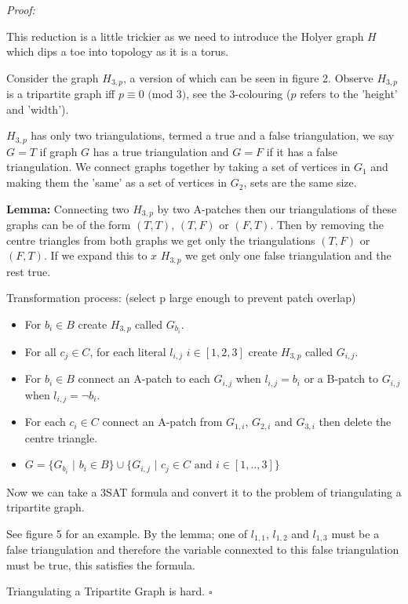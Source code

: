 \documentclass[a4paper,12pt]{article}
\begin{document}
\textit{Proof:}

This reduction is a little trickier as we need to introduce the Holyer graph $H$ which dips a toe into topology as it is a torus.

Consider the graph $H_{3,p}$, a version of which can be seen in figure 2. Observe $H_{3,p}$ is a tripartite graph iff $p\equiv0 \text{ (mod }3)$, see the 3-colouring ($p$ refers to the 'height' and 'width').

$H_{3,p}$ has only two triangulations, termed a true and a false triangulation, we say $G=T$ if graph $G$ has a true triangulation and $G=F$ if it has a false triangulation. We connect graphs together by taking a set of vertices in $G_1$ and making them the 'same' as a set of vertices in $G_2$, sets are the same size.

\textbf{Lemma:} Connecting two $H_{3,p}$ by two A-patches then our triangulations of these graphs can be of the form $(T,T)$, $(T,F)$ or $(F,T)$. Then by removing the centre triangles from both graphs we get only the triangulations $(T,F)$ or $(F,T)$. If we expand this to $x$ $H_{3,p}$ we get only one false triangulation and the rest true.


Transformation process: (select p large enough to prevent patch overlap)
\begin{itemize}
\item For $b_i\in B$ create $H_{3,p}$ called $G_{b_i}$.
\item For all $c_j\in C$, for each literal $l_{i,j}$ $i\in [1,2,3]$ create $H_{3,p}$ called $G_{i,j}$.
\item For $b_i \in B$ connect an A-patch to each $G_{i,j}$ when $l_{i,j}=b_i$ or a B-patch to $G_{i,j}$ when $l_{i,j}=\neg b_i$. 
\item For each $c_i\in C$ connect an A-patch from $G_{1,i}$, $G_{2,i}$ and $G_{3,i}$ then delete the centre triangle. 
\item $G = \{G_{b_i}$ $|$ $b_i \in B\}\cup\{G_{i,j}$ $|$ $ c_j\in C\text{ and }i\in [1,..,3] \}$
\end{itemize}

Now we can take a 3SAT formula and convert it to the problem of triangulating a tripartite graph.

See figure 5 for an example. By the lemma; one of $l_{1,1}$, $l_{1,2}$ and $l_{1,3}$ must be a false triangulation and therefore the variable connexted to this false triangulation must be true, this satisfies the formula.

Triangulating a Tripartite Graph is hard. $\square$
\end{document}
